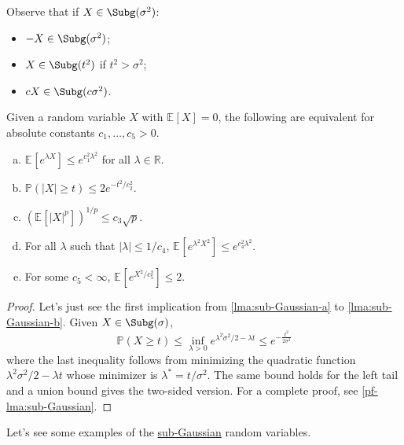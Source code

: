 \begin{remark}
	Observe that if \(X\in \Subg(\sigma ^{2} ) \):
	\begin{itemize}
		\item \(-X\in \Subg(\sigma ^{2} ) \);
		\item \(X \in \Subg(t^2) \) if \(t^2 > \sigma ^{2} \);
		\item \(cX\in \Subg(c \sigma ^{2} ) \).
	\end{itemize}
\end{remark}

\begin{lemma}\label{lma:sub-Gaussian}
	Given a random variable \(X\) with \(\mathbb{E}_{}\left[X \right] =0\), the following are equivalent for absolute constants \(c_1, \dots , c_5 > 0\).
	\begin{enumerate}[(a)]
		\item\label{lma:sub-Gaussian-a} \(\mathbb{E}_{}\left[e^{\lambda X} \right] \leq e^{c_1^2 \lambda ^2}\) for all \(\lambda \in \mathbb{R} \).
		\item\label{lma:sub-Gaussian-b} \(\mathbb{P} (\vert X \vert \geq t) \leq 2 e^{- t^2 / c_2^2}\).
		\item\label{lma:sub-Gaussian-c} \(\left( \mathbb{E}_{}\left[\vert X \vert ^p \right]  \right)^{1 / p} \leq c_3 \sqrt{p}  \).
		\item\label{lma:sub-Gaussian-d} For all \(\lambda \) such that \(\vert \lambda  \vert \leq 1 / c_4 \), \(\mathbb{E}_{}\left[e^{\lambda ^2 X^2} \right] \leq e^{c_4^2 \lambda ^2} \).
		\item\label{lma:sub-Gaussian-e} For some \(c_5 < \infty \), \(\mathbb{E}_{}\left[e^{X^2 / c_5^2}  \right] \leq 2\).
	\end{enumerate}
\end{lemma}
\begin{proof}
	Let's just see the first implication from \autoref{lma:sub-Gaussian-a} to \autoref{lma:sub-Gaussian-b}. Given \(X \in \Subg(\sigma ) \),
	\[
		\mathbb{P} (X\geq t) \leq \inf _{\lambda > 0} e^{\lambda ^2 \sigma ^2 / 2 - \lambda t} \leq e^{-\frac{t^2}{2\sigma ^2}}
	\]
	where the last inequality follows from minimizing the quadratic function \(\lambda ^{2} \sigma ^{2} / 2 - \lambda t\) whose minimizer is \(\lambda ^{\ast} = t / \sigma ^{2} \). The same bound holds for the left tail and a union bound gives the two-sided version. For a complete proof, see \autoref{pf-lma:sub-Gaussian}.
\end{proof}

Let's see some examples of the \hyperref[def:sub-Gaussian]{sub-Gaussian} random variables.

